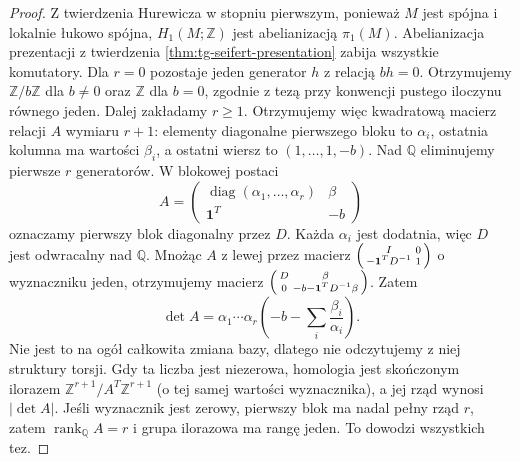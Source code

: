 \begin{proof}
Z twierdzenia Hurewicza w stopniu pierwszym,
ponieważ $M$ jest spójna i lokalnie łukowo spójna,
$H_1(M;\mathbb Z)$ jest abelianizacją $\pi_1(M)$.
Abelianizacja prezentacji z twierdzenia
\ref{thm:tg-seifert-presentation} zabija wszystkie
komutatory. Dla $r=0$ pozostaje jeden generator
$h$ z relacją $bh=0$. Otrzymujemy
$\mathbb Z/b\mathbb Z$ dla $b\ne0$ oraz
$\mathbb Z$ dla $b=0$, zgodnie z tezą przy
konwencji pustego iloczynu równego jeden.
Dalej zakładamy $r\ge1$. Otrzymujemy więc kwadratową macierz
relacji $A$ wymiaru $r+1$: elementy diagonalne
pierwszego bloku to $\alpha_i$, ostatnia kolumna
ma wartości $\beta_i$, a ostatni wiersz to
$(1,\ldots,1,-b)$.
Nad $\mathbb Q$ eliminujemy pierwsze $r$ generatorów.
W blokowej postaci
\[
A=\begin{pmatrix}
\operatorname{diag}(\alpha_1,\ldots,\alpha_r)&\beta\\
\mathbf 1^T&-b
\end{pmatrix}
\]
oznaczamy pierwszy blok diagonalny przez $D$.
Każda $\alpha_i$ jest dodatnia, więc $D$ jest
odwracalny nad $\mathbb Q$. Mnożąc $A$ z lewej
przez macierz
$\begin{psmallmatrix}I&0\\-\mathbf 1^TD^{-1}&1\end{psmallmatrix}$
o wyznaczniku jeden, otrzymujemy macierz
$\begin{psmallmatrix}D&\beta\\0&-b-\mathbf 1^TD^{-1}\beta\end{psmallmatrix}$.
Zatem
\[
\det A=\alpha_1\cdots\alpha_r
\left(-b-\sum_i\frac{\beta_i}{\alpha_i}\right).
\]
Nie jest to na ogół całkowita zmiana bazy,
dlatego nie odczytujemy z niej struktury torsji.
Gdy ta liczba jest niezerowa, homologia jest skończonym
ilorazem $\mathbb Z^{r+1}/A^T\mathbb Z^{r+1}$
(o tej samej wartości wyznacznika), a jej rząd
wynosi $|\det A|$. Jeśli wyznacznik jest zerowy,
pierwszy blok ma nadal pełny rząd $r$, zatem
$\operatorname{rank}_{\mathbb Q}A=r$ i grupa
ilorazowa ma rangę jeden. To dowodzi wszystkich tez.
\end{proof}

